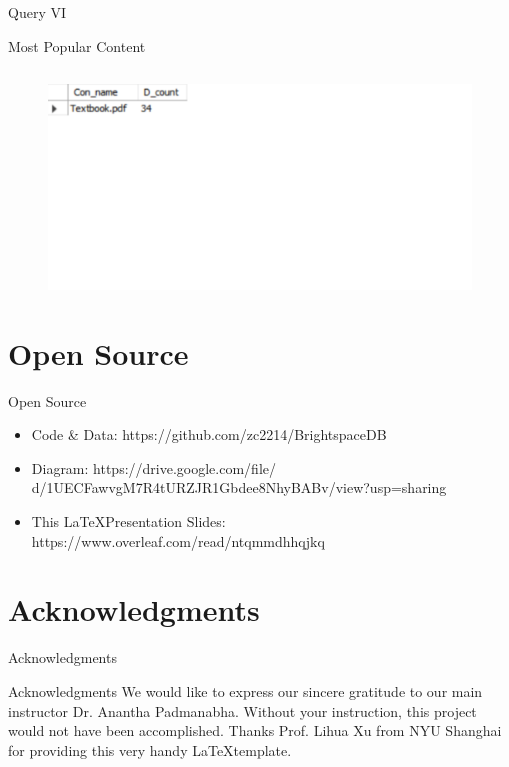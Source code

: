 \documentclass[a4paper,10pt]{beamer}
\begin{document}
\begin{frame}{Query VI}
\begin{block}{Most Popular Content}
    \inputminted[linenos]{mysql}{6.txt}
\end{block}
\begin{figure}[H]
    \includegraphics[width=\textwidth]{6.png}
\end{figure}
\end{frame}


\section{Open Source}
\begin{frame}{Open Source}
\begin{block}{}
\begin{itemize}
    \item Code \& Data: https://github.com/zc2214/BrightspaceDB
    \item Diagram: https://drive.google.com/file/
    d/1UECFawvgM7R4tURZJR1Gbdee8NhyBABv/view?usp=sharing
    \item This \LaTeX \space Presentation Slides: https://www.overleaf.com/read/ntqmmdhhqjkq
\end{itemize}
\end{block}
\end{frame}

\section{Acknowledgments}
\begin{frame}{Acknowledgments}
\begin{block}{Acknowledgments}
We would like to express our sincere gratitude to our main instructor Dr. Anantha Padmanabha. Without your instruction, this project would not have been accomplished. Thanks Prof. Lihua Xu from NYU Shanghai for providing this very handy \LaTeX \space template.
\end{block}
\end{frame}
\end{document}
